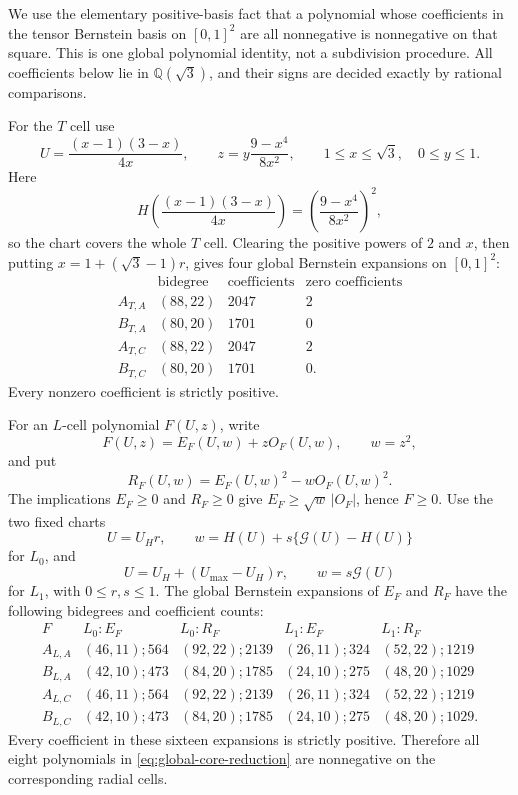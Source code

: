 We use the elementary positive-basis fact that a polynomial whose
coefficients in the tensor Bernstein basis on $[0,1]^2$ are all nonnegative
is nonnegative on that square.  This is one global polynomial identity, not a
subdivision procedure.  All coefficients below lie in $\mathbb Q(\sqrt3)$,
and their signs are decided exactly by rational comparisons.

For the $T$ cell use
\begin{equation}
 U=\frac{(x-1)(3-x)}{4x},
 \qquad z=y\frac{9-x^4}{8x^2},
 \qquad 1\le x\le\sqrt3,
 \quad 0\le y\le1.
 \label{eq:global-T-chart}
\end{equation}
Here
\[
 H\!\left(\frac{(x-1)(3-x)}{4x}\right)
 =\left(\frac{9-x^4}{8x^2}\right)^2,
\]
so the chart covers the whole $T$ cell.  Clearing the positive powers of
$2$ and $x$, then putting $x=1+(\sqrt3-1)r$, gives four global Bernstein
expansions on $[0,1]^2$:
\[
\begin{array}{c|ccc}
&\text{bidegree}&\text{coefficients}&\text{zero coefficients}\\ \hline
A_{T,A}&(88,22)&2047&2\\
B_{T,A}&(80,20)&1701&0\\
A_{T,C}&(88,22)&2047&2\\
B_{T,C}&(80,20)&1701&0.
\end{array}
\]
Every nonzero coefficient is strictly positive.

For an $L$-cell polynomial $F(U,z)$, write
\[
 F(U,z)=E_F(U,w)+zO_F(U,w),\qquad w=z^2,
\]
and put
\[
 R_F(U,w)=E_F(U,w)^2-wO_F(U,w)^2.
\]
The implications $E_F\ge0$ and $R_F\ge0$ give
$E_F\ge\sqrt w\,|O_F|$, hence $F\ge0$.  Use the two fixed charts
\begin{equation}
 U=U_Hr,
 \qquad
 w=H(U)+s\{\mathcal G(U)-H(U)\}
 \label{eq:global-L0-chart}
\end{equation}
for $L_0$, and
\begin{equation}
 U=U_H+(U_{\max}-U_H)r,
 \qquad w=s\mathcal G(U)
 \label{eq:global-L1-chart}
\end{equation}
for $L_1$, with $0\le r,s\le1$.  The global Bernstein expansions of
$E_F$ and $R_F$ have the following bidegrees and coefficient counts:
\[
\begin{array}{c|cc|cc}
F&L_0:E_F&L_0:R_F&L_1:E_F&L_1:R_F\\ \hline
A_{L,A}&(46,11);564&(92,22);2139&(26,11);324&(52,22);1219\\
B_{L,A}&(42,10);473&(84,20);1785&(24,10);275&(48,20);1029\\
A_{L,C}&(46,11);564&(92,22);2139&(26,11);324&(52,22);1219\\
B_{L,C}&(42,10);473&(84,20);1785&(24,10);275&(48,20);1029.
\end{array}
\]
Every coefficient in these sixteen expansions is strictly positive.
Therefore all eight polynomials in \eqref{eq:global-core-reduction} are
nonnegative on the corresponding radial cells.

